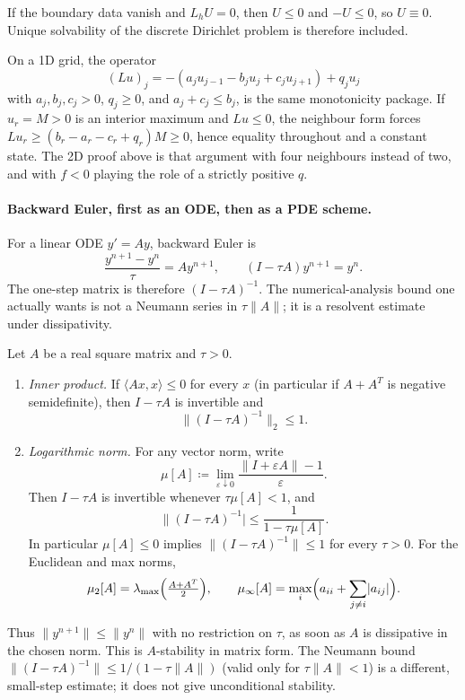 \documentclass[11pt,a4paper]{article}
\begin{document}
If the boundary data vanish and \(L_h U=0\), then \(U\le 0\) and \(-U\le 0\), so \(U\equiv 0\). Unique solvability of the discrete Dirichlet problem is therefore included.

\begin{example}
\label{ex:1d-dmp}
On a 1D grid, the operator
\[
(Lu)_j=-(a_j u_{j-1}-b_j u_j+c_j u_{j+1})+q_j u_j
\]
with \(a_j,b_j,c_j>0\), \(q_j\ge 0\), and \(a_j+c_j\le b_j\), is the same monotonicity package. If \(u_r=M>0\) is an interior maximum and \(Lu\le 0\), the neighbour form forces \(Lu_r\ge(b_r-a_r-c_r+q_r)M\ge 0\), hence equality throughout and a constant state. The 2D proof above is that argument with four neighbours instead of two, and with \(f<0\) playing the role of a strictly positive \(q\).
\end{example}

\paragraph{Backward Euler, first as an ODE, then as a PDE scheme.}

For a linear ODE \(y'=Ay\), backward Euler is
\[
\frac{y^{n+1}-y^n}{\tau}
=
A y^{n+1},
\qquad
(I-\tau A)y^{n+1}=y^n.
\]
The one-step matrix is therefore \((I-\tau A)^{-1}\). The numerical-analysis bound one actually wants is not a Neumann series in \(\tau\|A\|\); it is a resolvent estimate under dissipativity.

\begin{lemma}
\label{lem:be-resolvent}
Let \(A\) be a real square matrix and \(\tau>0\).
\begin{enumerate}[label=\textup{(\roman*)}]
    \item
    \emph{Inner product.} If \(\langle Ax,x\rangle\le 0\) for every \(x\) (in particular if \(A+A^{T}\) is negative semidefinite), then \(I-\tau A\) is invertible and
    \[
    \bigl\|(I-\tau A)^{-1}\bigr\|_{2}
    \le
    1.
    \]
    \item
    \emph{Logarithmic norm.} For any vector norm, write
    \[
    \mu[A]
    \coloneqq
    \lim_{\varepsilon\downarrow 0}\frac{\|I+\varepsilon A\|-1}{\varepsilon}.
    \]
    Then \(I-\tau A\) is invertible whenever \(\tau\mu[A]<1\), and
    \[
    \bigl\|(I-\tau A)^{-1}\bigr|
    \le
    \frac{1}{1-\tau\mu[A]}.
    \]
    In particular \(\mu[A]\le 0\) implies \(\bigl\|(I-\tau A)^{-1}\bigr\|\le 1\) for every \(\tau>0\). For the Euclidean and max norms,
    \[
    \mu_{2}[A]
    =
    \lambda_{\max}\Bigl(\tfrac{A+A^{T}}{2}\Bigr),
    \qquad
    \mu_{\infty}[A]
    =
    \max_{i}\Bigl(a_{ii}+\sum_{j\neq i}\lvert a_{ij}\rvert\Bigr).
    \]
\end{enumerate}
Thus \(\|y^{n+1}\|\le\|y^n\|\) with no restriction on \(\tau\), as soon as \(A\) is dissipative in the chosen norm. This is \(A\)-stability in matrix form. The Neumann bound \(\bigl\|(I-\tau A)^{-1}\bigr\|\le 1/(1-\tau\|A\|)\) (valid only for \(\tau\|A\|<1\)) is a different, small-step estimate; it does not give unconditional stability.
\end{lemma}
\end{document}
